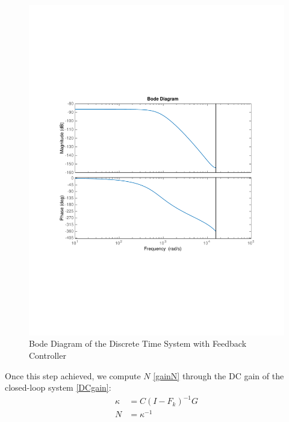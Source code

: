 \begin{figure}[H]
 \centering 
 \includegraphics[trim=2cm 7cm 2cm 7cm, clip=true, totalheight=0.35\textheight, angle=0]{figures/P15bodeLambda.pdf}
 \caption{Bode Diagram of the Discrete Time System with Feedback Controller}
 \label{fig:bodeLambda}
\end{figure}

Once this step achieved, we compute $N$ \eqref{gainN} through the DC gain of the closed-loop system \eqref{DCgain}:
\begin{align}
\kappa &= C(I-F_k)^{-1}G \label{DCgain} \\
N &= \kappa^{-1} \label{gainN}
\end{align}

